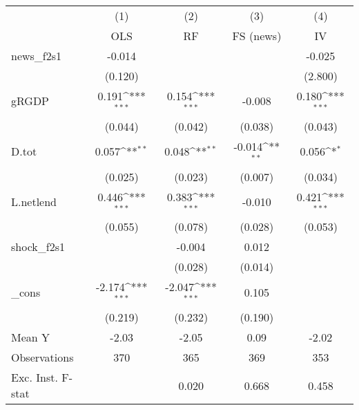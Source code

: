 {
\def\sym#1{\ifmmode^{#1}\else\(^{#1}\)\fi}
\begin{tabular}{l*{4}{c}}
\toprule
            &\multicolumn{1}{c}{(1)}&\multicolumn{1}{c}{(2)}&\multicolumn{1}{c}{(3)}&\multicolumn{1}{c}{(4)}\\
            &\multicolumn{1}{c}{OLS}&\multicolumn{1}{c}{RF}&\multicolumn{1}{c}{FS (news)}&\multicolumn{1}{c}{IV}\\
\midrule
news\_f2s1   &      -0.014         &                     &                     &      -0.025         \\
            &     (0.120)         &                     &                     &     (2.800)         \\
\addlinespace
gRGDP       &       0.191\sym{***}&       0.154\sym{***}&      -0.008         &       0.180\sym{***}\\
            &     (0.044)         &     (0.042)         &     (0.038)         &     (0.043)         \\
\addlinespace
D.tot       &       0.057\sym{**} &       0.048\sym{**} &      -0.014\sym{**} &       0.056\sym{*}  \\
            &     (0.025)         &     (0.023)         &     (0.007)         &     (0.034)         \\
\addlinespace
L.netlend   &       0.446\sym{***}&       0.383\sym{***}&      -0.010         &       0.421\sym{***}\\
            &     (0.055)         &     (0.078)         &     (0.028)         &     (0.053)         \\
\addlinespace
shock\_f2s1  &                     &      -0.004         &       0.012         &                     \\
            &                     &     (0.028)         &     (0.014)         &                     \\
\addlinespace
\_cons      &      -2.174\sym{***}&      -2.047\sym{***}&       0.105         &                     \\
            &     (0.219)         &     (0.232)         &     (0.190)         &                     \\
\midrule
Mean Y      &       -2.03         &       -2.05         &        0.09         &       -2.02         \\
Observations&         370         &         365         &         369         &         353         \\
Exc. Inst. F-stat&                     &       0.020         &       0.668         &       0.458         \\
\bottomrule
\end{tabular}
}
